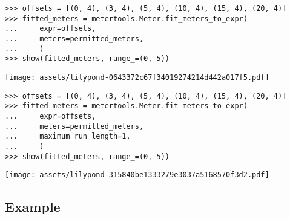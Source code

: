 \begin{comment}
<abjad>
offsets = [(0, 4), (3, 4), (5, 4), (10, 4), (15, 4), (20, 4)]
fitted_meters = metertools.Meter.fit_meters_to_expr(
    expr=offsets,
    meters=permitted_meters,
    )
show(fitted_meters, range_=(0, 5))
</abjad>
\end{comment}

\begin{singlespacing}
\vspace{-0.5\baselineskip}
\begin{lstlisting}
>>> offsets = [(0, 4), (3, 4), (5, 4), (10, 4), (15, 4), (20, 4)]
>>> fitted_meters = metertools.Meter.fit_meters_to_expr(
...     expr=offsets,
...     meters=permitted_meters,
...     )
>>> show(fitted_meters, range_=(0, 5))
\end{lstlisting}
\noindent\texttt{[image: assets/lilypond-0643372c67f34019274214d442a017f5.pdf]}
\end{singlespacing}

\begin{comment}
<abjad>
offsets = [(0, 4), (3, 4), (5, 4), (10, 4), (15, 4), (20, 4)]
fitted_meters = metertools.Meter.fit_meters_to_expr(
    expr=offsets,
    meters=permitted_meters,
    maximum_run_length=1,
    )
show(fitted_meters, range_=(0, 5))
</abjad>
\end{comment}

\begin{singlespacing}
\vspace{-0.5\baselineskip}
\begin{lstlisting}
>>> offsets = [(0, 4), (3, 4), (5, 4), (10, 4), (15, 4), (20, 4)]
>>> fitted_meters = metertools.Meter.fit_meters_to_expr(
...     expr=offsets,
...     meters=permitted_meters,
...     maximum_run_length=1,
...     )
>>> show(fitted_meters, range_=(0, 5))
\end{lstlisting}
\noindent\texttt{[image: assets/lilypond-315840be1333279e3037a5168570f3d2.pdf]}
\end{singlespacing}

\subsection{Example}

\begin{comment}
<abjad>
music_specifiers = collections.OrderedDict([
    ('Voice 1', None),
    ('Voice 2', None),
    ('Voice 3', None),
    ('Voice 4', None),
    ])
target_timespan = timespantools.Timespan(0, (19, 4))
timespan_inventory = talea_timespan_maker(
    music_specifiers=music_specifiers,
    target_timespan=target_timespan,
    )
show(timespan_inventory, key='voice_name')
</abjad>
\end{comment}

